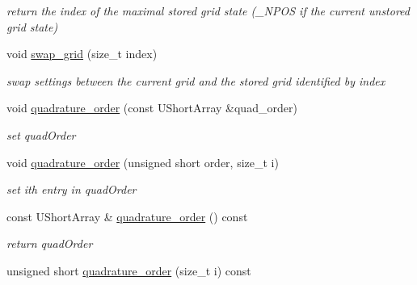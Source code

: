 \begin{DoxyCompactItemize}
\begin{DoxyCompactList}\small\item\em return the index of the maximal stored grid state (\+\_\+\+N\+P\+OS if the current unstored grid state) \end{DoxyCompactList}\item 
void \hyperlink{classPecos_1_1TensorProductDriver_ae42d43e21fe55d5b6cca7edf86e54818}{swap\+\_\+grid} (size\+\_\+t index)\label{classPecos_1_1TensorProductDriver_ae42d43e21fe55d5b6cca7edf86e54818}

\begin{DoxyCompactList}\small\item\em swap settings between the current grid and the stored grid identified by index \end{DoxyCompactList}\item 
void \hyperlink{classPecos_1_1TensorProductDriver_ae55b4ae52e072091747fe6ed9c6e2988}{quadrature\+\_\+order} (const U\+Short\+Array \&quad\+\_\+order)\label{classPecos_1_1TensorProductDriver_ae55b4ae52e072091747fe6ed9c6e2988}

\begin{DoxyCompactList}\small\item\em set quad\+Order \end{DoxyCompactList}\item 
void \hyperlink{classPecos_1_1TensorProductDriver_abba1bdfd4a0b326b09e89e46d65373b8}{quadrature\+\_\+order} (unsigned short order, size\+\_\+t i)\label{classPecos_1_1TensorProductDriver_abba1bdfd4a0b326b09e89e46d65373b8}

\begin{DoxyCompactList}\small\item\em set ith entry in quad\+Order \end{DoxyCompactList}\item 
const U\+Short\+Array \& \hyperlink{classPecos_1_1TensorProductDriver_abdba729134a01c13868b3ca725e8bfe2}{quadrature\+\_\+order} () const \label{classPecos_1_1TensorProductDriver_abdba729134a01c13868b3ca725e8bfe2}

\begin{DoxyCompactList}\small\item\em return quad\+Order \end{DoxyCompactList}\item 
unsigned short \hyperlink{classPecos_1_1TensorProductDriver_a4ffd3d7aa0448b510cd2f15ad472a4f6}{quadrature\+\_\+order} (size\+\_\+t i) const \label{classPecos_1_1TensorProductDriver_a4ffd3d7aa0448b510cd2f15ad472a4f6}


\end{DoxyCompactItemize}
